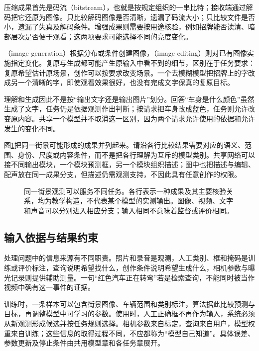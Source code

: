 压缩成果首先是码流（bitstream），也就是按规定组织的一串比特；接收端通过解码把它还原为图像。只比较解码图像是否清晰，遗漏了码流大小；只比较文件是否小，遗漏了失真及解码条件。增强成果则需要按用途核验，例如招牌能否读清、暗部层次是否便于观看；这两项要求可能选择不同的亮度变化。

（image generation）根据分布或条件创建图像，（image editing）则对已有图像实施指定变化。复原与生成都可能产生原输入中看不到的细节，区别在于任务要求：复原希望估计原场景，创作可以按要求改变场景。一个去模糊模型把招牌上的字改成另一个清晰的字，即使观看效果很好，也没有完成文字保真的复原目标。

理解和生成因此不是按“输出文字还是输出图片”划分。回答“车身是什么颜色”虽然生成了文字，任务仍是依据观测作出判断；按请求把车身改成蓝色，任务则允许改变原内容。共享一个模型并不取消这一区别，因为两个请求允许使用的依据和允许发生的变化不同。

图\ref{fig:vision-task-map}把同一街景可能形成的成果并列起来。请沿各行比较结果需要对应的语义、范围、身份、尺度或内容条件，而不是把各行理解为互斥的模型类别。共享网络可以接不同输出模块，一个模块预测框，另一个模块组织描述；图中也把描述与编辑、配声放在同一成果分支，但描述仍需观测支持，不因此具有任意创作的权限。

\begin{figure}[htbp]
  \centering
  
  \caption{同一街景观测可以服务不同任务。各行表示一种成果及其主要核验关系，均为教学构造，不代表某个模型的实测输出。图像、视频、文字和声音可以分别进入相应分支；输入相同不意味着监督或评价相同。}
  \label{fig:vision-task-map}
\end{figure}

\subsection{输入依据与结果约束}
\label{sec:vision-overview-evidence}

处理问题中的信息来源有不同职责。照片和录音是观测，人工类别、框和掩码是训练或评价标注，查询说明希望找什么，创作条件说明希望生成什么，相机参数与曝光记录则提供辅助测量。一句“红色汽车正在转弯”若是检索查询，不能同时被当作视频中确有这一事件的证据。

训练时，一条样本可以包含街景图像、车辆范围和类别标注，算法据此比较预测与目标，再调整模型中可学习的参数。使用时，人工正确框不再作为输入，系统必须从新观测形成候选并按任务规则选择。相机参数来自标定，查询来自用户，模型权重来自训练；这些信息的取得过程不同，不应都称为“模型自己知道”。具体误差、参数更新及停止条件由共用模型章和各任务章展开。

